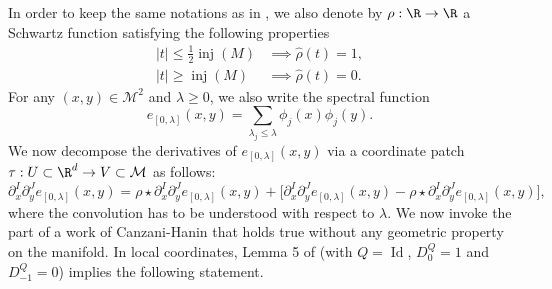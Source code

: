 In order to keep the same notations as in \cite[line (11)]{canzani2017c}, we also denote by $\rho:\R\to \R$ a Schwartz function satisfying the following properties
\begin{align}\label{rho0}
|t|\leq \frac{1}{2} \operatorname{inj}(M) &\implies \widehat{\rho}(t) = 1, \\
\nonumber
|t|\geq \operatorname{inj}(M)& \implies \widehat{\rho}(t)=0.
\end{align}
For any $(x,y)\in \mathcal{M}^2$ and $\lambda \geq 0$, we also write the spectral function
\begin{equation*}
e_{[0,\lambda]}(x,y)=\sum_{\lambda_j\leq \lambda} \phi_j(x)\phi_j(y).
\end{equation*}
We now decompose the derivatives of $e_{[0,\lambda]}(x,y)$ via a coordinate patch $\tau:U\subset\R^d\to V\subset \mathcal{M}$ as follows:
\begin{equation}\label{decomp}
\partial_x^{I} \partial_y^J e_{[0,\lambda]}(x,y)=\rho \star \partial_x^{I} \partial_y^J e_{[0,\lambda]}(x,y) +\bigl[\partial_x^{I} \partial_y^J e_{[0,\lambda]}(x,y)-\rho \star \partial_x^{I} \partial_y^J e_{[0,\lambda]}(x,y)\bigr],
\end{equation}
where the convolution
has to be understood with respect to $\lambda$.
We now invoke the part of a work of Canzani-Hanin that holds true without any geometric property on the manifold. In local coordinates, Lemma 5 of \cite{canzani2017c} (with $Q=\operatorname{Id}$, $D_0^Q=1$ and $D_{-1}^Q=0$) implies the following statement.

